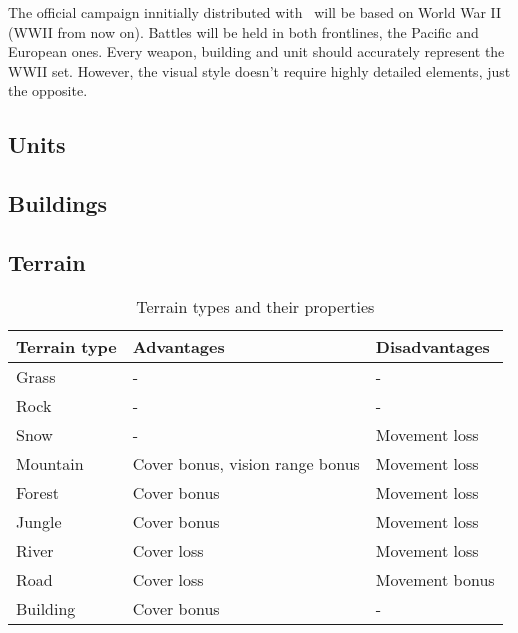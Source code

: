 The official campaign innitially distributed with \game\ will be based on World
War II (WWII from now on). Battles will be held in both frontlines, the Pacific
and European ones. Every weapon, building and unit should accurately represent
the WWII set. However, the visual style doesn't require highly detailed
elements, just the opposite.\\

\subsection{Units}








\subsection{Buildings}



\subsection{Terrain}


\begin{table}[H]
    \label{tab:terrain}
    \begin{center}
    \begin{tabular}{| l | m{5cm} | m{5cm} |}
        \hline
        \textbf{Terrain type} & \textbf{Advantages} & \textbf{Disadvantages} \\
        \hline
        Grass & -& - \\
        \hline
        Rock & - & - \\
        \hline
        Snow & - & Movement loss \\
        \hline
        Mountain & Cover bonus, vision range bonus & Movement loss \\
        \hline
        Forest & Cover bonus & Movement loss \\
        \hline
        Jungle & Cover bonus & Movement loss \\
        \hline
        River & Cover loss & Movement loss \\
        \hline
        Road & Cover loss & Movement bonus \\
        \hline
        Building & Cover bonus & - \\
        \hline
    \end{tabular}
    \end{center}
\caption{Terrain types and their properties}
\end{table}



